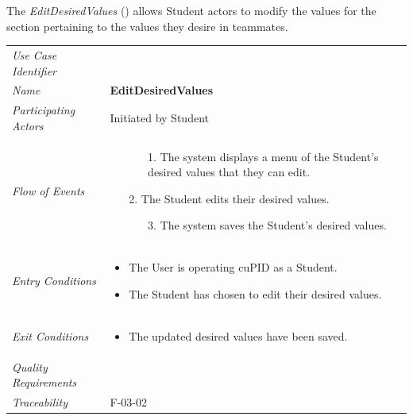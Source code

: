 \documentclass[12pt,letterpaper]{article}
\begin{document}
\vspace{1em}
The {\it EditDesiredValues} () allows Student actors to modify the values for the section pertaining to the values they desire in teammates.

\begin{center}
	\begin{tabu} to 
		\toprule
		Use Case Identifier &  \\
		Name & {\bf EditDesiredValues} \\
		Participating Actors & Initiated by Student \\
		Flow of Events & 
		\begin{minipage}[t]{\linewidth}
		    \begin{enumerate}
		        \item[]
		        \begin{enumerate}
				    \item[1.] The system displays a menu of the Student's desired values that they can edit.
		        \end{enumerate}
	            \item[2.] The Student edits their desired values.
	            \begin{enumerate}
				    \item[3.] The system saves the Student's desired values.
		        \end{enumerate}
			\end{enumerate}		
		\end{minipage} \\

		Entry Conditions &
		\begin{minipage}[t]{\linewidth}
			\begin{itemize}
			    \item The User is operating cuPID as a Student.
			    \item The Student has chosen to edit their desired values.
	        \end{itemize}
		\end{minipage} \\

		Exit Conditions &
		\begin{minipage}[t]{\linewidth}
			\begin{itemize}
			    \item The updated desired values have been saved.
	        \end{itemize}
		\end{minipage} \\

		Quality Requirements & \\

		Traceability &  F-03-02\\
		\toprule
	\end{tabu}
\end{center}
\end{document}
